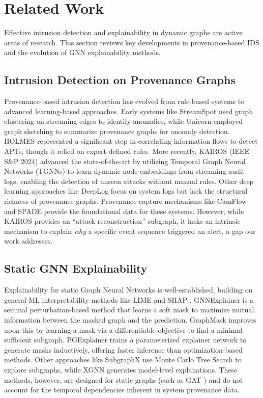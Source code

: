 \documentclass[conference]{IEEEtran}
\begin{document}
\section{Related Work}
Effective intrusion detection and explainability in dynamic graphs are active areas of research. This section reviews key developments in provenance-based IDS and the evolution of GNN explainability methods.

\subsection{Intrusion Detection on Provenance Graphs}
Provenance-based intrusion detection has evolved from rule-based systems to advanced learning-based approaches. Early systems like StreamSpot \cite{b10} used graph clustering on streaming edges to identify anomalies, while Unicorn \cite{b4} employed graph sketching to summarize provenance graphs for anomaly detection. HOLMES \cite{b3} represented a significant step in correlating information flows to detect APTs, though it relied on expert-defined rules. More recently, KAIROS \cite{b5} (IEEE S\&P 2024) advanced the state-of-the-art by utilizing Temporal Graph Neural Networks (TGNNs) \cite{b2} to learn dynamic node embeddings from streaming audit logs, enabling the detection of unseen attacks without manual rules. Other deep learning approaches like DeepLog \cite{b16} focus on system logs but lack the structural richness of provenance graphs. Provenance capture mechanisms like CamFlow \cite{b14} and SPADE \cite{b15} provide the foundational data for these systems. However, while KAIROS provides an ``attack reconstruction'' subgraph, it lacks an intrinsic mechanism to explain \textit{why} a specific event sequence triggered an alert, a gap our work addresses.

\subsection{Static GNN Explainability}
Explainability for static Graph Neural Networks is well-established, building on general ML interpretability methods like LIME \cite{b12} and SHAP \cite{b13}. GNNExplainer \cite{b6} is a seminal perturbation-based method that learns a soft mask to maximize mutual information between the masked graph and the prediction. GraphMask \cite{b7} improves upon this by learning a mask via a differentiable objective to find a minimal sufficient subgraph. PGExplainer \cite{b11} trains a parameterized explainer network to generate masks inductively, offering faster inference than optimization-based methods. Other approaches like SubgraphX \cite{b8} use Monte Carlo Tree Search to explore subgraphs, while XGNN \cite{b17} generates model-level explanations. These methods, however, are designed for static graphs (such as GAT \cite{b18}) and do not account for the temporal dependencies inherent in system provenance data.
\end{document}
